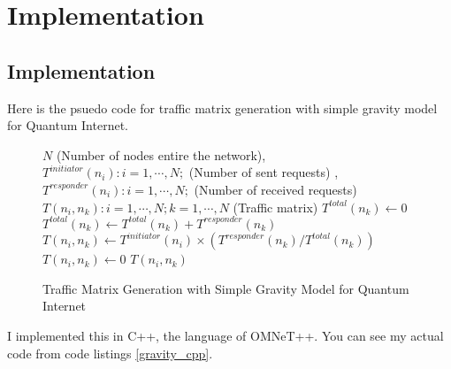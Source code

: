 \chapter{Implementation}
\label{implementation}

\section{Implementation}

Here is the psuedo code for traffic matrix generation with simple gravity model for Quantum Internet.

\begin{figure}[H]
  \begin{algorithm}[H]
    \caption{Traffic Matrix Generation with Simple Gravity Model for Quantum Internet}
    \label{alg1}
    \begin{algorithmic}
      \Require 
      $N$ (Number of nodes entire the network), \\
      $T^{initiator}(n_i) : i = 1, \cdots, N;$ (Number of sent requests) ,\\
      $T^{responder}(n_i) : i = 1, \cdots, N;$ (Number of received requests)
      \Ensure $T(n_i, n_k) : i = 1, \cdots, N; k = 1, \cdots, N$ (Traffic matrix)
        \State $T^{total}(n_k) \leftarrow 0$
            \State $T^{total}(n_k) \leftarrow T^{total}(n_k) + T^{responder}(n_k)$
          \EndIf
        \EndFor
            \State $T(n_i, n_k) \leftarrow T^{initiator}(n_i) \times (T^{responder}(n_k) / T^{total}(n_k))$
          \Else
            \State $T(n_i, n_k) \leftarrow 0$
          \EndIf
        \EndFor
      \EndFor
      \State \Return $T(n_i, n_k)$
    \end{algorithmic}
  \end{algorithm}
\end{figure}

I implemented this in C++, the language of OMNeT++. You can see my actual code from code listings \ref{gravity_cpp}.


